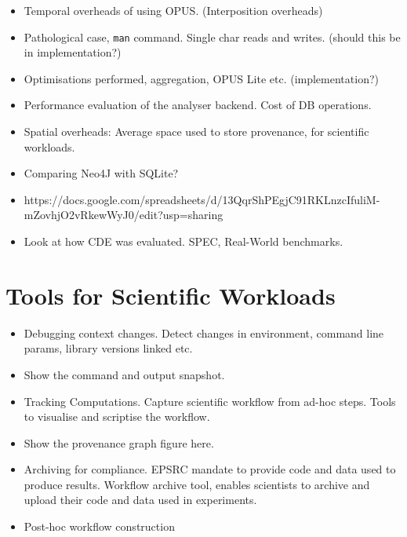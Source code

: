 \documentclass[withindex,glossary]{cam-thesis}
\begin{document}
\begin{itemize}
\item Temporal overheads of using OPUS. (Interposition overheads)
\item Pathological case, \texttt{man} command. Single char reads and writes. (should this be in implementation?)
\item Optimisations performed, aggregation, OPUS Lite etc. (implementation?)
\item Performance evaluation of the analyser backend. Cost of DB operations.
\item Spatial overheads: Average space used to store provenance, for scientific workloads.
\item Comparing Neo4J with SQLite?
\item https://docs.google.com/spreadsheets/d/13QqrShPEgjC91RKLnzcIfuliM-mZovhjO2vRkewWyJ0/edit?usp=sharing
\item Look at how CDE was evaluated. SPEC, Real-World benchmarks.
\end{itemize}

\section{Tools for Scientific Workloads}
\begin{itemize}
\item Debugging context changes. Detect changes in environment, command line params, library versions linked etc.
\item Show the command and output snapshot.
\item Tracking Computations. Capture scientific workflow from ad-hoc steps. Tools to visualise and scriptise the workflow.
\item Show the provenance graph figure here.
\item Archiving for compliance. EPSRC mandate to provide code and data used to produce results. Workflow archive tool, enables scientists to archive and upload their code and data used in experiments.
\item Post-hoc workflow construction
\end{itemize}

\end{document}
